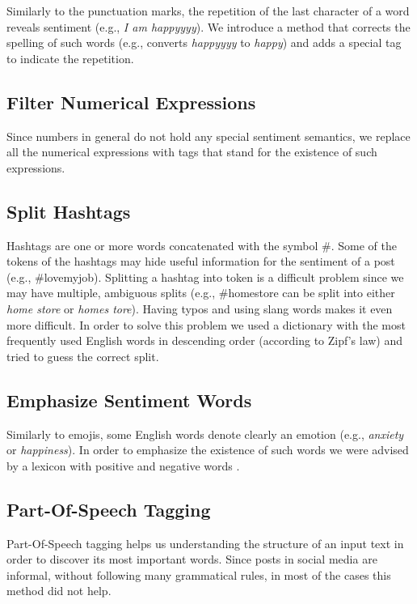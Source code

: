 Similarly to the punctuation marks, the repetition of the last character of a word reveals sentiment (e.g., \textit{I am happyyyy}). We introduce a method that corrects the spelling of such words (e.g., converts \textit{happyyyy} to \textit{happy}) and adds a special tag to indicate the repetition.

\subsection{Filter Numerical Expressions}
Since numbers in general do not hold any special sentiment semantics,  
we replace all the numerical expressions with tags that stand for the existence of such expressions. 

\subsection{Split Hashtags}
Hashtags are one or more words concatenated with the symbol \#.
Some of the tokens of the hashtags may hide useful information for the sentiment of a post (e.g., \#lovemyjob).
Splitting a hashtag into token is a difficult problem \cite{Khaitan:2009:DCS:1645953.1645982} since we may have multiple, ambiguous splits (e.g., \#homestore can be split into either \textit{home store} or \textit{homes tore}). 
Having typos and using slang words makes it even more difficult.
In order to solve this problem we used a dictionary with the most frequently used English words in descending order (according to Zipf's law) and tried to guess the correct split.


\subsection{Emphasize Sentiment Words}
Similarly to emojis, some English words denote clearly an emotion (e.g., \textit{anxiety} or \textit{happiness}). In order to emphasize the existence of such words
we were advised by a lexicon with positive and negative words \cite{hu2004mining}. 


\subsection{Part-Of-Speech Tagging}
Part-Of-Speech tagging helps us understanding the structure of an input text in order to discover its most important words.
Since posts in social media are informal, without following many grammatical rules, 
in most of the cases this method did not help.

